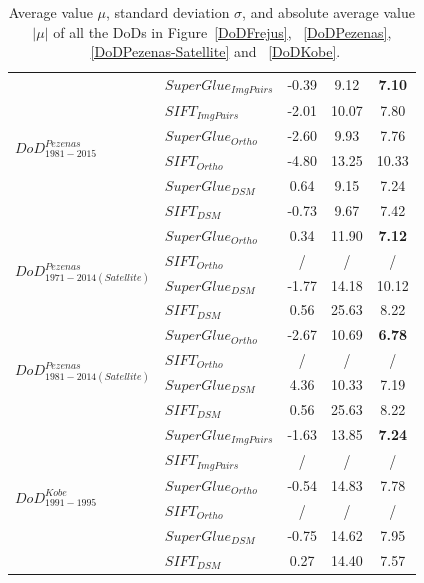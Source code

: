 \begin{table}
\begin{tabular}{||l|l|c|c|c||}
\multirow{6}{*}{$DoD^{Pezenas}_{1981-2015}$}&${SuperGlue_{ImgPairs}}$ & -0.39 & 9.12 & \textbf{7.10}\\
&${SIFT_{ImgPairs}}$ & -2.01 & 10.07 & 7.80\\
&${SuperGlue_{Ortho}}$ & -2.60 & 9.93 & 7.76\\
&${SIFT_{Ortho}}$ & -4.80 & 13.25 & 10.33\\
&${SuperGlue_{DSM}}$ & 0.64 & 9.15 & 7.24\\
&${SIFT_{DSM}}$ & -0.73 & 9.67 & 7.42\\\hline

\multirow{4}{*}{$DoD^{Pezenas}_{1971-2014(Satellite)}$}&${SuperGlue_{Ortho}}$ & 0.34 & 11.90 & \textbf{7.12}\\
&${SIFT_{Ortho}}$ & / &/ &/ \\
&${SuperGlue_{DSM}}$ & -1.77 & 14.18 & 10.12\\
&${SIFT_{DSM}}$ & 0.56 & 25.63 & 8.22\\\hline

\multirow{4}{*}{$DoD^{Pezenas}_{1981-2014(Satellite)}$}&${SuperGlue_{Ortho}}$ & -2.67 & 10.69 & \textbf{6.78}\\
&${SIFT_{Ortho}}$ & / &/ &/ \\
&${SuperGlue_{DSM}}$ & 4.36 & 10.33 & 7.19\\
&${SIFT_{DSM}}$ & 0.56 & 25.63 & 8.22\\\hline


\multirow{6}{*}{$DoD^{Kobe}_{1991-1995}$}&${SuperGlue_{ImgPairs}}$ & -1.63 & 13.85 & \textbf{7.24}\\
&${SIFT_{ImgPairs}}$ & / & / & / \\
&${SuperGlue_{Ortho}}$ & -0.54 & 14.83 & 7.78\\
&${SIFT_{Ortho}}$ & / & / & / \\
&${SuperGlue_{DSM}}$ & -0.75 & 14.62 & 7.95\\
&${SIFT_{DSM}}$ & 0.27 & 14.40 & 7.57\\\hline
	
\end{tabular}
\caption{Average value $\mu$, standard deviation $\sigma$, and absolute average value $|\mu|$ of all the DoDs in Figure~\ref{DoDFrejus}, ~\ref{DoDPezenas}, ~\ref{DoDPezenas-Satellite} and ~\ref{DoDKobe}.}
\label{CheckptAcuracy}
\end{table}


